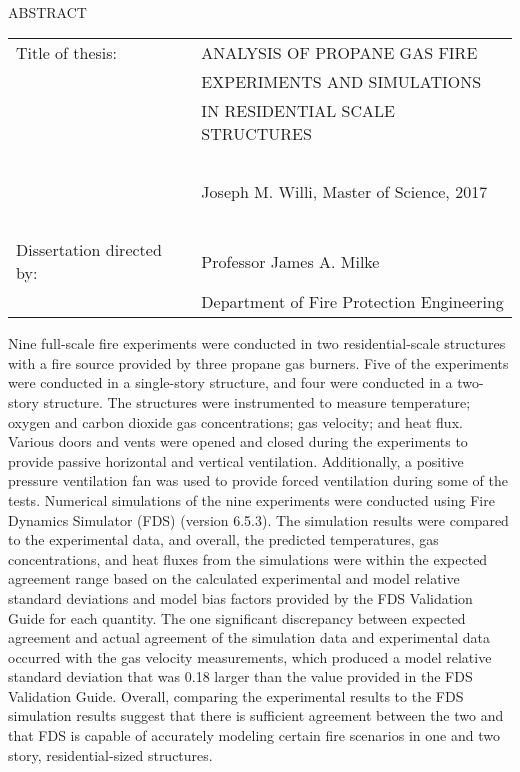 
\hbox{\ }

\renewcommand{\baselinestretch}{1}
\small \normalsize

\begin{center}
\large{{ABSTRACT}} 

\vspace{3em} 

\end{center}
\hspace{-.15in}
\begin{tabular}{ll}
Title of thesis:		& {\large  ANALYSIS OF PROPANE GAS FIRE}	\\
							& {\large  EXPERIMENTS AND SIMULATIONS} 	\\
							& {\large  IN RESIDENTIAL SCALE STRUCTURES} \\
\ \\
							& {\large  Joseph M. Willi, Master of Science, 2017} \\
\ \\
Dissertation directed by: 	& {\large  Professor James A. Milke} \\
							& {\large  Department of Fire Protection Engineering} \\
\end{tabular}

\vspace{3em}

\renewcommand{\baselinestretch}{2}
\large \normalsize

Nine full-scale fire experiments were conducted in two residential-scale structures with a fire source provided by three propane gas burners. Five of the experiments were conducted in a single-story structure, and four were conducted in a two-story structure. The structures were instrumented to measure temperature; oxygen and carbon dioxide gas concentrations; gas velocity; and heat flux. Various doors and vents were opened and closed during the experiments to provide passive horizontal and vertical ventilation. Additionally, a positive pressure ventilation fan was used to provide forced ventilation during some of the tests. Numerical simulations of the nine experiments were conducted using Fire Dynamics Simulator (FDS) (version 6.5.3). The simulation results were compared to the experimental data, and overall, the predicted temperatures, gas concentrations, and heat fluxes from the simulations were within the expected agreement range based on the calculated experimental and model relative standard deviations and model bias factors provided by the FDS Validation Guide for each quantity. The one significant discrepancy between expected agreement and actual agreement of the simulation data and experimental data occurred with the gas velocity measurements, which produced a model relative standard deviation that was 0.18 larger than the value provided in the FDS Validation Guide. Overall, comparing the experimental results to the FDS simulation results suggest that there is sufficient agreement between the two and that FDS is capable of accurately modeling certain fire scenarios in one and two story, residential-sized structures.


